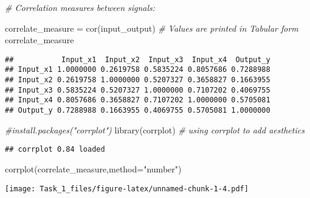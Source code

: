 \documentclass[
]{article}
\newenvironment{Shaded}{\begin{snugshade}}{\end{snugshade}}
\newcommand{\AttributeTok}[1]{\textcolor[rgb]{0.77,0.63,0.00}{#1}}
\newcommand{\CommentTok}[1]{\textcolor[rgb]{0.56,0.35,0.01}{\textit{#1}}}
\newcommand{\FunctionTok}[1]{\textcolor[rgb]{0.00,0.00,0.00}{#1}}
\newcommand{\NormalTok}[1]{#1}
\newcommand{\OtherTok}[1]{\textcolor[rgb]{0.56,0.35,0.01}{#1}}
\newcommand{\StringTok}[1]{\textcolor[rgb]{0.31,0.60,0.02}{#1}}
\begin{document}
\begin{Shaded}
\begin{Highlighting}[]
\CommentTok{\# Correlation measures between signals:}

\NormalTok{correlate\_measure }\OtherTok{=} \FunctionTok{cor}\NormalTok{(input\_output) }\CommentTok{\# Values are printed in Tabular form}
\NormalTok{correlate\_measure}
\end{Highlighting}
\end{Shaded}

\begin{verbatim}
##           Input_x1  Input_x2  Input_x3  Input_x4  Output_y
## Input_x1 1.0000000 0.2619758 0.5835224 0.8057686 0.7288988
## Input_x2 0.2619758 1.0000000 0.5207327 0.3658827 0.1663955
## Input_x3 0.5835224 0.5207327 1.0000000 0.7107202 0.4069755
## Input_x4 0.8057686 0.3658827 0.7107202 1.0000000 0.5705081
## Output_y 0.7288988 0.1663955 0.4069755 0.5705081 1.0000000
\end{verbatim}

\begin{Shaded}
\begin{Highlighting}[]
\CommentTok{\#install.packages("corrplot")}
\FunctionTok{library}\NormalTok{(corrplot) }\CommentTok{\# using corrplot to add aesthetics}
\end{Highlighting}
\end{Shaded}

\begin{verbatim}
## corrplot 0.84 loaded
\end{verbatim}

\begin{Shaded}
\begin{Highlighting}[]
\FunctionTok{corrplot}\NormalTok{(correlate\_measure,}\AttributeTok{method=}\StringTok{"number"}\NormalTok{)}
\end{Highlighting}
\end{Shaded}

\texttt{[image: Task\_1\_files/figure-latex/unnamed-chunk-1-4.pdf]}
\end{document}

